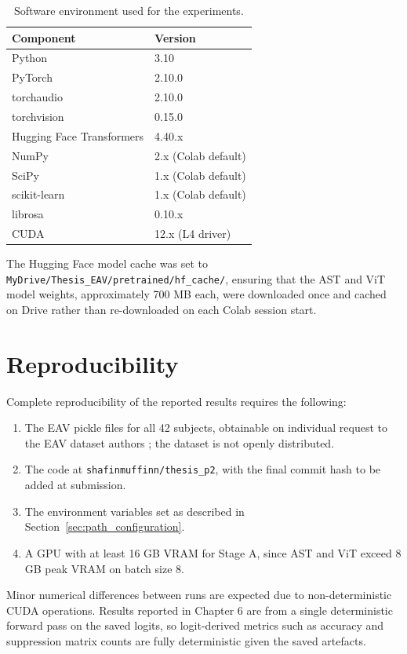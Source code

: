 \begin{table}[htbp]
\centering
\small
\caption{Software environment used for the experiments.}
\label{tab:software_environment}
\begin{tabular}{p{5cm} p{6cm}}
\hline
\textbf{Component} & \textbf{Version} \\
\hline
Python & 3.10 \\
PyTorch & 2.10.0 \\
torchaudio & 2.10.0 \\
torchvision & 0.15.0 \\
Hugging Face Transformers & 4.40.x \\
NumPy & 2.x (Colab default) \\
SciPy & 1.x (Colab default) \\
scikit-learn & 1.x (Colab default) \\
librosa & 0.10.x \\
CUDA & 12.x (L4 driver) \\
\hline
\end{tabular}
\end{table}

The Hugging Face model cache was set to \texttt{MyDrive/Thesis\_EAV/pretrained/hf\_cache/}, ensuring that the AST and ViT model weights, approximately 700 MB each, were downloaded once and cached on Drive rather than re-downloaded on each Colab session start.

\section{Reproducibility}
Complete reproducibility of the reported results requires the following:

\begin{enumerate}
    \item The EAV pickle files for all 42 subjects, obtainable on individual request to the EAV dataset authors \cite{Lee2024EAV}; the dataset is not openly distributed.
    \item The code at \texttt{shafinmuffinn/thesis\_p2}, with the final commit hash to be added at submission.
    \item The environment variables set as described in Section~\ref{sec:path_configuration}.
    \item A GPU with at least 16 GB VRAM for Stage A, since AST and ViT exceed 8 GB peak VRAM on batch size 8.
\end{enumerate}

Minor numerical differences between runs are expected due to non-deterministic CUDA operations. Results reported in Chapter 6 are from a single deterministic forward pass on the saved logits, so logit-derived metrics such as accuracy and suppression matrix counts are fully deterministic given the saved artefacts.